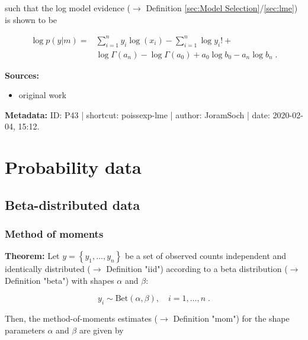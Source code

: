 \documentclass[a4paper,12pt]{book}
\begin{document}
such that the log model evidence ($\rightarrow$ Definition \ref{sec:Model Selection}/\ref{sec:lme}) is shown to be

\begin{equation} \label{eq:poissexp-lme-Poiss-exp-LME-qed}
\begin{split}
\log p(y|m) = &\sum_{i=1}^n y_i \log(x_i) - \sum_{i=1}^n \log y_i ! + \\ 
&\log \Gamma(a_n) - \log \Gamma(a_0) + a_0 \log b_0 - a_n \log b_n \; .
\end{split}
\end{equation}

\vspace{1em}
\textbf{Sources:}
\begin{itemize}
\item original work\end{itemize}


\vspace{1em}
\textbf{Metadata:} ID: P43 | shortcut: poissexp-lme | author: JoramSoch | date: 2020-02-04, 15:12.


\pagebreak
\section{Probability data}

\subsection{Beta-distributed data}

\subsubsection[\textbf{Method of moments}]{Method of moments} \label{sec:beta-mom}

\vspace{1em}
\textbf{Theorem:} Let $y = \left\lbrace y_1, \ldots, y_n \right\rbrace$ be a set of observed counts independent and identically distributed ($\rightarrow$ Definition "iid") according to a beta distribution ($\rightarrow$ Definition "beta") with shapes $\alpha$ and $\beta$:

\begin{equation} \label{eq:beta-mom-Beta}
y_i \sim \mathrm{Bet}(\alpha,\beta), \quad i = 1, \ldots, n \; .
\end{equation}

Then, the method-of-moments estimates ($\rightarrow$ Definition "mom") for the shape parameters $\alpha$ and $\beta$ are given by
\end{document}
